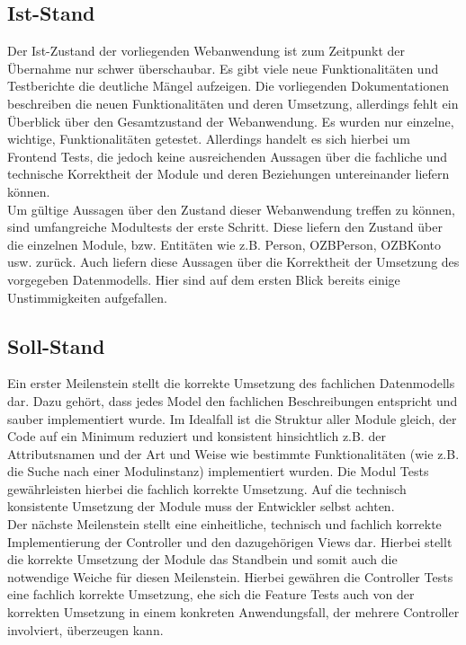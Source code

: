 \documentclass[12pt,             %
               a4paper,          %
               listof=totoc,     %
               index=totoc,      %
               bibliography=totoc,%
               oneside,         %
               BCOR1cm,          %
               english   %
               ]{scrbook}
\begin{document}
\subsection{Ist-Stand}
Der Ist-Zustand der vorliegenden Webanwendung ist zum Zeitpunkt der Übernahme nur schwer überschaubar. Es gibt viele neue Funktionalitäten und Testberichte die deutliche Mängel aufzeigen. Die vorliegenden Dokumentationen beschreiben die neuen Funktionalitäten und deren Umsetzung, allerdings fehlt ein Überblick über den Gesamtzustand der Webanwendung. Es wurden nur einzelne, wichtige, Funktionalitäten getestet. Allerdings handelt es sich hierbei um Frontend Tests, die jedoch keine ausreichenden Aussagen über die fachliche und technische Korrektheit der Module und deren Beziehungen untereinander liefern können.\\

Um gültige Aussagen über den Zustand dieser Webanwendung treffen zu können, sind umfangreiche Modultests der erste Schritt. Diese liefern den Zustand über die einzelnen Module, bzw. Entitäten wie z.B. Person, OZBPerson, OZBKonto usw. zurück. Auch liefern diese Aussagen über die Korrektheit der Umsetzung des vorgegeben Datenmodells. Hier sind auf dem ersten Blick bereits einige Unstimmigkeiten aufgefallen.\\

\subsection{Soll-Stand} 
Ein erster Meilenstein stellt die korrekte Umsetzung des fachlichen Datenmodells dar. Dazu gehört, dass jedes Model den fachlichen Beschreibungen entspricht und sauber implementiert wurde. Im Idealfall ist die Struktur aller Module gleich, der Code auf ein Minimum reduziert und konsistent hinsichtlich z.B. der Attributsnamen und der Art und Weise wie bestimmte Funktionalitäten (wie z.B. die Suche nach einer Modulinstanz) implementiert wurden. Die Modul Tests gewährleisten hierbei die fachlich korrekte Umsetzung. Auf die technisch konsistente Umsetzung der Module muss der Entwickler selbst achten.\\
Der nächste Meilenstein stellt eine einheitliche, technisch und fachlich korrekte Implementierung der Controller und den dazugehörigen Views dar. Hierbei stellt die korrekte Umsetzung der Module das Standbein und somit auch die notwendige Weiche für diesen Meilenstein. Hierbei gewähren die Controller Tests eine fachlich korrekte Umsetzung, ehe sich die Feature Tests auch von der korrekten Umsetzung in einem konkreten Anwendungsfall, der mehrere Controller involviert, überzeugen kann.
\end{document}

